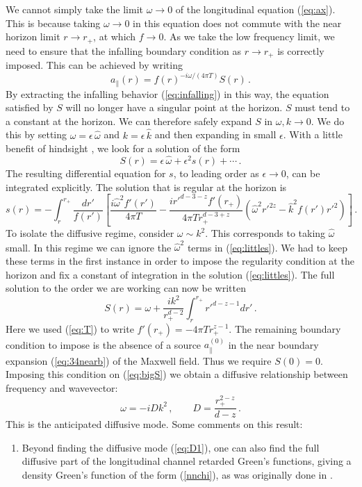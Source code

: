 \documentclass[10pt, oneside]{book}
\def\be{\begin{equation}}
\def\ee{\end{equation}}
\begin{document}
\begin{doublespace}
We cannot simply take the limit $\omega \to 0$ of the longitudinal equation (\ref{eq:ax}). This is because taking $\omega \to 0$ in this equation does not commute with the near horizon limit $r \to r_+$, at which $f \to 0$. As we take the low frequency limit, we need to ensure that the infalling boundary condition as $r \to r_+$ is correctly imposed. This can be achieved by writing
\be
a_\parallel(r) = f(r)^{- i \omega/(4 \pi T)} S(r) \,. 
\ee
By extracting the infalling behavior (\ref{eq:infalling}) in this way, the equation satisfied by $S$ will no longer have a singular point at the horizon. $S$ must tend to a constant at the horizon. We can therefore safely expand $S$ in $\omega,k \to 0$.  
 We do this by setting $\omega = \epsilon\, \hat \omega$ and $k = \epsilon\, \hat k$ and then expanding in small $\epsilon$. With a little benefit of hindsight \cite{Starinets:2008fb}, we look for a solution of the form
\be
S(r) = \epsilon \, \hat \omega + \epsilon^2 s(r) + \cdots \,.
\ee
The resulting differential equation for $s$, to leading order as $\epsilon \to 0$, can be integrated explicitly. The solution that is regular at the horizon is
\be\label{eq:littles}
s(r) = - \int_r^{r_+} \frac{dr'}{f(r')} \left[  \frac{i \hat \omega^2 f'(r')}{4 \pi T} -\frac{i r'^{d-3-z} f'(r_+)}{4 \pi T r_+^{d-3+z}}  \left(\hat \omega^2 r'^{2z} - \hat k^2 f(r') r'^2 \right) \right]\,. 
\ee
To isolate the diffusive regime, consider $\omega \sim k^2$. This corresponds to taking $\hat \omega$ small. In this regime we can ignore the $\hat \omega^2$ terms in (\ref{eq:littles}). We had to keep these terms in the first instance in order to impose the regularity condition at the horizon and fix a constant of integration in the solution (\ref{eq:littles}). The full solution to the order we are working can now be written
\be\label{eq:bigS}
S(r) = \omega + \frac{i k^2}{r_+^{d-2}} \int^{r_+}_r r'^{d-z-1} dr' \,.
\ee
Here we used (\ref{eq:T}) to write $f'(r_+) = - 4 \pi T r_+^{z-1}$.
The remaining boundary condition to impose is the absence of a source $a_\parallel^{(0)}$ in the near boundary expansion (\ref{eq:34nearb}) of the Maxwell field. Thus we require $S(0) = 0$. Imposing this condition on (\ref{eq:bigS}) we obtain a diffusive relationship between frequency and wavevector:
\be\label{eq:D1}
\omega = - i D k^2 \,, \qquad D = \frac{r_+^{2-z}}{d-z} \,.   
\ee
This is the anticipated diffusive mode. Some comments on this result:
\begin{enumerate}
\item Beyond finding the diffusive mode (\ref{eq:D1}), one can also find the full diffusive part of the longitudinal channel retarded Green's functions, giving a density Green's function of the form (\ref{nnchi}), as was originally done in \cite{Policastro:2002se,Herzog:2002fn}.

\end{enumerate}
\end{doublespace}
\end{document}
